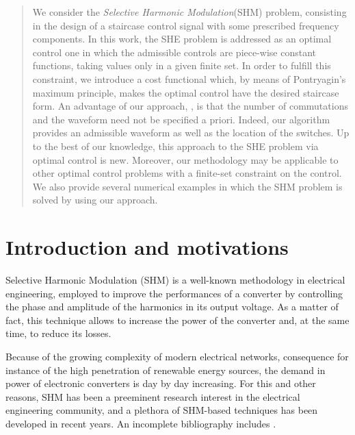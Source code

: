 \documentclass[twocolumn]{autart}    %
\begin{document}
\begin{frontmatter}
\begin{abstract}                          %
We consider the \emph{Selective Harmonic Modulation}(SHM) problem, consisting in the design of a staircase control signal with some prescribed frequency components. In this work, the SHE problem is addressed as an optimal control one in which the admissible controls are piece-wise constant functions, taking values only in a given finite set. In order to fulfill this constraint, we  introduce a cost functional  which, by means of Pontryagin's maximum principle, makes the optimal control have the desired staircase form. An advantage of our approach, , is that the number of commutations and the waveform need not be specified a priori. Indeed, our algorithm provides an admissible waveform as well as the location of the switches. Up to the best of our knowledge, this approach to the SHE problem via optimal control is new. Moreover, our methodology may be applicable to other optimal control problems with a finite-set constraint on the control. We also provide several numerical examples in which the SHM problem is solved by using our approach.
\end{abstract}

\end{frontmatter}


\section{Introduction and motivations}\label{Section1}

Selective Harmonic Modulation (SHM) \cite{Rodriguez2002} is a well-known methodology in electrical engineering, employed to improve the performances of a converter by controlling the phase and amplitude of the harmonics in its output voltage. As a matter of fact, this technique allows to increase the power of the converter and, at the same time, to reduce its losses. 

Because of the growing complexity of modern electrical networks, consequence for instance of the high penetration of renewable energy sources, the demand in power of electronic converters is day by day increasing. For this and other reasons, SHM has been a preeminent research interest in the electrical engineering community, and a plethora of SHM-based techniques has been developed in recent years. An incomplete bibliography includes \cite{duranay2017selective,Janabi2020,Yang2017}.
\end{document}
